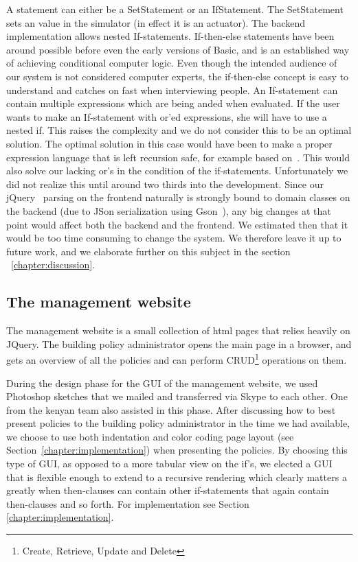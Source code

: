 A statement can either be a SetStatement or an IfStatement. The SetStatement sets an value in the simulator (in effect it is an actuator). The backend implementation allows nested If-statements. If-then-else statements have been around possible before even the early versions of Basic, and is an established way of achieving conditional computer logic. Even though the intended audience of our system is not considered computer experts, the if-then-else concept is easy to understand and catches on fast when interviewing people. An If-statement can contain multiple expressions which are being anded when evaluated. If the user wants to make an If-statement with or'ed expressions, she will have to use a nested if. This raises the complexity and we do not consider this to be an optimal solution. The optimal solution in this case would have been to make a proper expression language that is left recursion safe, for example based on~\cite{left-recursion}. This would also solve our lacking or's in the condition of the if-statements. Unfortunately we did not realize this until around two thirds into the development. Since our jQuery~\cite{jquery} parsing on the frontend naturally is strongly bound to domain classes on the backend (due to JSon serialization using Gson~\cite{gson}), any big changes at that point would affect both the backend and the frontend. We estimated then that it would be too time consuming to change the system. We therefore leave it up to future work, and we elaborate further on this subject in the section ~\ref{chapter:discussion}. 

\subsection{The management website}
The management website is a small collection of html pages that relies heavily on JQuery. The building policy administrator opens the main page in a browser, and gets an overview of all the policies and can perform CRUD\footnote{Create, Retrieve, Update and Delete} operations on them.

During the design phase for the GUI of the management website, we used Photoshop sketches that we mailed and transferred via Skype to each other. One from the kenyan team also assisted in this phase. After discussing how to best present policies to the building policy administrator in the time we had available, we choose to use both indentation and color coding page layout (see Section~\ref{chapter:implementation}) when presenting the policies. By choosing this type of GUI, as opposed to a more tabular view on the if's, we elected a GUI that is flexible enough to extend to a recursive rendering which clearly matters a greatly when then-clauses can contain other if-statements that again contain then-clauses and so forth. For implementation see Section \ref{chapter:implementation}.

